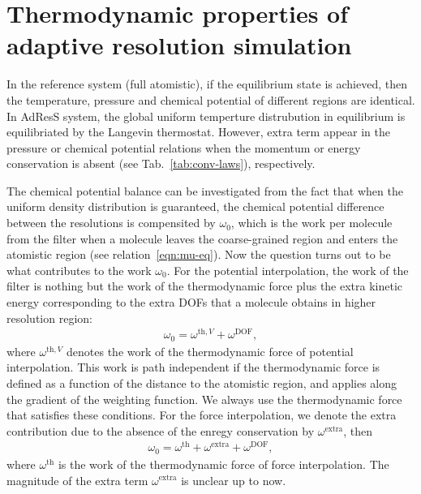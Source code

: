 \documentclass[epjST]{svjour}
\newcommand{\thf}{{\textrm{th}}}
\newcommand{\dof}{{\textrm{DOF}}}
\newcommand{\exc}{{\textrm{extra}}}
\begin{document}
      



\section{Thermodynamic properties of adaptive resolution simulation}
\label{sec:thermodynamic}

In the reference system (full atomistic), if the equilibrium state is achieved, then
the temperature, pressure and chemical potential of different regions are identical.
In AdResS system, the global uniform
temperture distrubution in equilibrium is equilibriated by the Langevin
thermostat.  However, extra term appear in the pressure or chemical
potential relations when the momentum or energy conservation is absent
(see Tab.~\ref{tab:conv-laws}), respectively.

The chemical potential balance can be investigated from the fact that
when the uniform density distribution is guaranteed, the chemical potential
difference between the resolutions is compensited by $\omega_0$, which
is the work per molecule from the filter when a molecule leaves the
coarse-grained region and enters the atomistic region (see
relation~\eqref{eqn:mu-eq}).  Now the question turns out to be what
contributes to the work $\omega_0$.  For the potential interpolation,
the work of the filter is nothing but the work of the thermodynamic
force plus the extra kinetic energy corresponding to the extra DOFs
that a molecule obtains in higher resolution region:
\begin{align}\label{eqn:mu0-v}
  \omega_0 = \omega^{\thf,V} + \omega^\dof,
\end{align}
where $ \omega^{\thf,V}$ denotes the work of the thermodynamic force
of potential interpolation.
This work is path independent if the thermodynamic force is defined as a function of the distance to the atomistic region, and applies along the gradient of the weighting function.
We always use the thermodynamic force that satisfies these conditions.
For the force interpolation, 
we denote the extra contribution due to the absence of the enregy conservation
by $\omega^\exc$, then
\begin{align}\label{eqn:mu0-f}
  \omega_0 = \omega^{\thf} + \omega^\exc + \omega^\dof,
\end{align}
where $\omega^{\thf}$ is the work of the thermodynamic force of force interpolation.
The magnitude of the extra term $\omega^\exc$ is unclear up to now.
\end{document}
